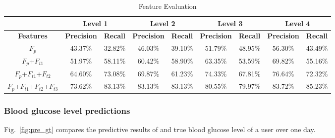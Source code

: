 \begin{table}[]
\small
\centering
\caption{Feature Evaluation}
\label{Feature_Evaluation}
\begin{tabular}{|c|c|c|c|c|c|c|c|c|}
\hline
                                   & \multicolumn{2}{c|}{\textbf{Level 1}}                     & \multicolumn{2}{c|}{\textbf{Level 2}} & \multicolumn{2}{c|}{\textbf{Level 3}}                     & \multicolumn{2}{c|}{\textbf{Level 4}}                     \\ \hline
\textbf{Features}                  & \textbf{Precision} & \multicolumn{1}{l|}{\textbf{Recall}} & \textbf{Precision}  & \textbf{Recall} & \textbf{Precision} & \multicolumn{1}{l|}{\textbf{Recall}} & \textbf{Precision} & \multicolumn{1}{l|}{\textbf{Recall}} \\ \hline
$F_{p}$                            & 43.37$\%$               & 32.82$\%$                                 & 46.03$\%$                & 39.10$\%$            & 51.79$\%$               & 48.95$\%$                                 & 56.30$\%$               & 43.49$\%$                                 \\ \hline
$F_{p}$+$F_{t1}$                   & 51.97$\%$               & 58.11$\%$                                 & 60.42$\%$                & 58.90$\%$            & 63.35$\%$               & 53.59$\%$                                 & 69.82$\%$               & 55.16$\%$                                 \\ \hline
$F_{p}$+$F_{t1}$+$F_{t2}$          & 64.60$\%$               & 73.08$\%$                                 & 69.87$\%$                & 61.23$\%$            & 74.33$\%$               & 67.81$\%$                                 & 76.64$\%$               & 72.32$\%$                                 \\ \hline
$F_{p}$+$F_{t1}$+$F_{t2}$+$F_{t3}$ & 73.62$\%$   & 83.13$\%$                                 & 83.13$\%$               & 83.13$\%$            & 80.55$\%$   & 79.97$\%$
& 83.72$\%$               & 85.23$\%$                                  \\ \hline
\end{tabular}
\end{table}


\subsubsection{Blood glucose level predictions}

Fig.~\ref{fig:pre_gt} compares the predictive results of \sysname and true blood glucose level of a user over one day.






